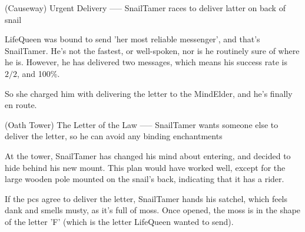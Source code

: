 (Causeway) Urgent Delivery
-----
{SnailTamer races to deliver latter on back of snail}

LifeQueen was bound to send 'her most reliable messenger', and that's SnailTamer.
He's not the fastest, or well-spoken, nor is he routinely sure of where he is.
However, he has delivered two messages, which means his success rate is $2/2$, and 100\%.

So she charged him with delivering the letter to the MindElder, and he's finally en route.

(Oath Tower) The Letter of the Law
-----
{SnailTamer wants someone else to deliver the letter, so he can avoid any binding enchantments}

At the tower, SnailTamer has changed his mind about entering, and decided to hide behind his new mount.
This plan would have worked well, except for the large wooden pole mounted on the snail's back, indicating that it has a rider.

If the \glspl{pc} agree to deliver the letter,
SnailTamer hands his satchel, which feels dank and smells musty, as it's full of moss.
Once opened, the moss is in the shape of the letter 'F' (which is the letter LifeQueen wanted to send).

